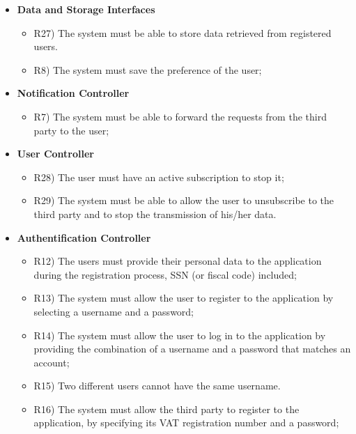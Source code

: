 \begin{itemize}
\begin{itemize}
		\end{itemize}
		\item \textbf{Data and Storage Interfaces}
		\begin{itemize}
			\item R27) The system must be able to store data retrieved from registered users.\\
			\item R8) The system must save the preference of the user;\\
		\end{itemize}
		\item \textbf{Notification Controller}
		\begin{itemize}
			\item R7) The system must be able to forward the requests from the third party to the user;\\
		\end{itemize}
		\item \textbf{User Controller}
		\begin{itemize}
			\item R28) The user must have an active subscription to stop it;\\
	 		\item R29) The system must be able to allow the user to unsubscribe to the third party and to stop the transmission of his/her data.\\
		\end{itemize}
		\item \textbf{Authentification Controller}
		\begin{itemize}
			\item R12) The users must provide their personal data to the application during the registration process, SSN (or fiscal code) included;\\
			\item R13) The system must allow the user to register to the application by selecting a username and a password;\\
			\item R14) The system must allow the user to log in to the application by providing the combination of a username and a password that matches an account;\\
			\item R15) Two different users cannot have the same username.\\
			\item R16) The system must allow the third party to register to the application, by specifying its VAT registration number and a password;\\

\end{itemize}
\end{itemize}
